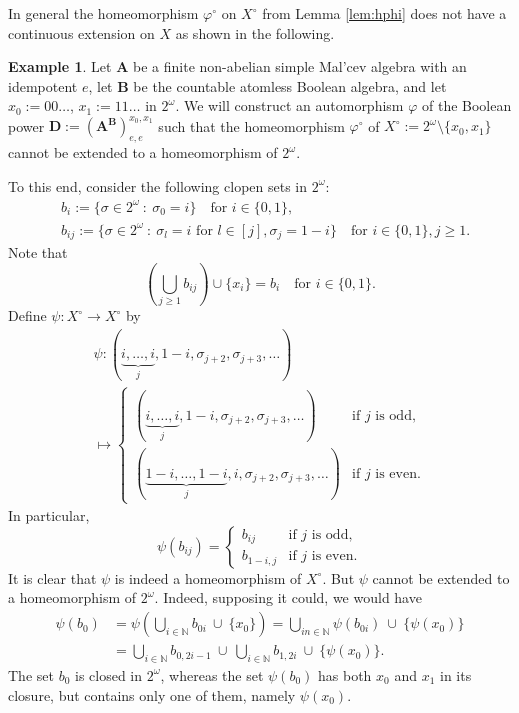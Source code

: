 \documentclass[12pt,a4paper,reqno]{amsart}
\numberwithin{equation}{section}
\theoremstyle{plain}
\theoremstyle{definition}
\newtheorem{exa}[thm]{Example}
\newcommand{\A}{\mathbf{A}}
\newcommand{\B}{\mathbf{B}}
\newcommand{\D}{\mathbf{D}}
\newcommand{\N}{\mathbb{N}}
\newcommand{\st}{\: :\:}
\begin{document}
In general the homeomorphism $\varphi^\circ$ on $X^\circ$ from Lemma \ref{lem:hphi}
does not have a continuous extension on $X$ as shown in the following.

 \begin{exa}
Let $\A$ be a  finite non-abelian simple Mal'cev algebra with an idempotent $e$,
let $\B$ be the countable atomless Boolean algebra, and let $x_0:=00\dots$, $x_1:=11\dots$ in $2^\omega$.
We will construct an automorphism $\varphi$ of the Boolean power 
$\D:= (\A^\B)^{x_0,x_1}_{e,e}$ such that the homeomorphism $\varphi^\circ$ of $X^\circ:=2^\omega\setminus\{x_0,x_1\}$
 cannot be extended to a homeomorphism of $2^\omega$.

 To this end, consider the following clopen sets in $2^\omega$:
\begin{align*}
&b_i:=\{ \sigma\in 2^\omega \st \sigma_0=i\} \quad \text{for } i\in\{0,1\},\\
&b_{ij}:=\{\sigma\in 2^\omega \st \sigma_l=i \text{ for } l\in [j], \sigma_{j}=1-i\} \quad \text{for } i\in\{0,1\}, j\geq 1.
\end{align*}
Note that
\[
(\bigcup_{j\geq 1} b_{ij} )\cup \{x_i\} =b_i \quad \text{for } i\in\{0,1\}.
\]
 Define $\psi: X^\circ\rightarrow X^\circ$ by
\begin{multline*}
\psi\colon   (\underbrace{i,\dots,i}_{j},1-i,\sigma_{j+2},\sigma_{j+3},\dots)\\
\mapsto
\begin{cases}
(\underbrace{i,\dots,i}_{j},1-i,\sigma_{j+2},\sigma_{j+3},\dots) &\text{if } j \text{ is odd},\\
(\underbrace{1-i,\dots,1-i}_{j},i,\sigma_{j+2},\sigma_{j+3},\dots)&\text{if } j \text{ is even}.
\end{cases}
\end{multline*}
In particular,
\[
\psi (b_{ij})=\begin{cases} b_{ij} &\text{if } j \text{ is odd},\\
b_{1-i,j} &\text{if } j \text{ is even}.
\end{cases}
\]
It is clear that $\psi$ is indeed a homeomorphism of $X^\circ$.
But $\psi$ cannot be extended to a homeomorphism of $2^\omega$. Indeed, supposing it could, 
we would have
\begin{align*}
\psi(b_0) & =\psi(\bigcup_{i\in \N} b_{0i}\ \cup\: \{x_0\})
=\bigcup_{in\in\N} \psi(b_{0i})\ \cup\: \{\psi(x_0)\}
\\
&=\bigcup_{i\in \N} b_{0,2i-1}\ \cup\ \bigcup_{i\in\N} b_{1,2i}\ \cup\: \{\psi(x_0)\}.
\end{align*}
The set $b_0$ is closed in $2^\omega$, whereas the set $\psi(b_0)$ has both $x_0$ and $x_1$ in its closure,
but contains only one of them, namely $\psi(x_0)$.


\end{exa}
\end{document}
